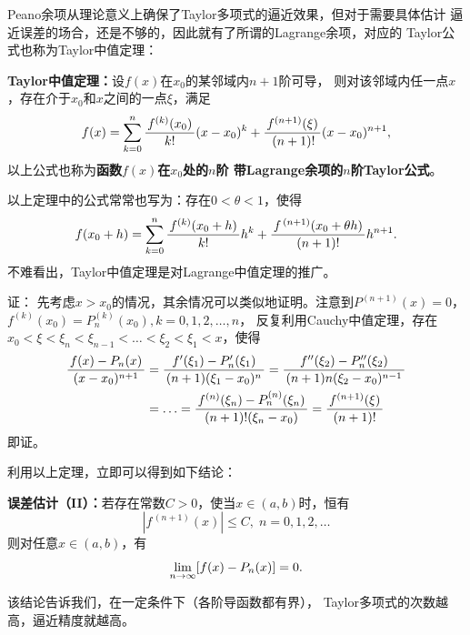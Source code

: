 Peano余项从理论意义上确保了Taylor多项式的逼近效果，但对于需要具体估计
逼近误差的场合，还是不够的，因此就有了所谓的{\kaishu Lagrange余项}，对应的
Taylor公式也称为Taylor中值定理：

\begin{thx}
	{\bf Taylor中值定理：}设$f(x)$在$x_0$的某邻域内$n+1$阶可导，
	则对该邻域内任一点$x$，存在介于$x_0$和$x$之间的一点$\xi$，满足
	$$f(x)=\sum\limits_{k=0}^n\displaystyle\frac{\,{f^{(k)}(x_0)}\,}{\,{k!}\,}(x-x_0)^k
	+\displaystyle\frac{\,{f^{(n+1)}(\xi)}\,}{\,{\,(n+1)!}\,}(x-x_0)^{n+1},$$
	以上公式也称为{\bf 函数$f(x)$在$x_0$处的$n$阶
	带Lagrange余项的$n$阶Taylor公式}。
\end{thx}

以上定理中的公式常常也写为：存在$0<\theta<1$，使得
$$f(x_0+h)=\sum\limits_{k=0}^n\displaystyle\frac{\,{f^{(k)}(x_0+h)}\,}{\,{k!}\,}h^k
+\displaystyle\frac{\,{f^{\,(n+1)}(x_0+\theta h)}\,}{\,{(n+1)!}\,}h^{n+1}.$$
不难看出，Taylor中值定理是对Lagrange中值定理的推广。

证：
先考虑$x>x_0$的情况，其余情况可以类似地证明。注意到$P^{(n+1)}(x)=0$，
$f^{(k)}(x_0)=P^{(k)}_n(x_0),k=0,1,2,\ldots,n$，
反复利用Cauchy中值定理，存在$x_0<\xi<\xi_n<\xi_{n-1}
<\ldots<\xi_2<\xi_1<x$，使得
\begin{align}
	\displaystyle\frac{\,{f(x)-P_n(x)}\,}{\,{(x-x_0)^{n+1}}\,}
	&=\displaystyle\frac{\,{f'(\xi_1)-P'_n(\xi_1)}\,}{\,{(n+1)(\xi_1-x_0)^{n}}\,}
	=\displaystyle\frac{\,{f''(\xi_2)-P''_n(\xi_2)}\,}{\,{(n+1)n(\xi_2-x_0)^{n-1}}\,}\notag\\
	&=\ldots=\displaystyle\frac{\,{f^{(n)}(\xi_n)-P^{(n)}_n(\xi_n)}\,}{\,{(n+1)!(\xi_n-x_0)}\,}
	=\displaystyle\frac{\,{f^{(n+1)}(\xi)}\,}{\,{(n+1)!}\,}\notag
\end{align}
即证。\fin

利用以上定理，立即可以得到如下结论：
\begin{thx}
	{\bf 误差估计（II）：}若存在常数$C>0$，使当$x\in(a,b)$时，恒有
	$$|f^{\,(n+1)}(x)|\leq C,\;n=0,1,2,\ldots$$
	则对任意$x\in(a,b)$，有
	$$\lim\limits_{n\to\infty} [f(x)-P_n(x)]=0.$$
\end{thx}
该结论告诉我们，{\kaishu 在一定条件下}（各阶导函数都有界），
Taylor多项式的次数越高，逼近精度就越高。


